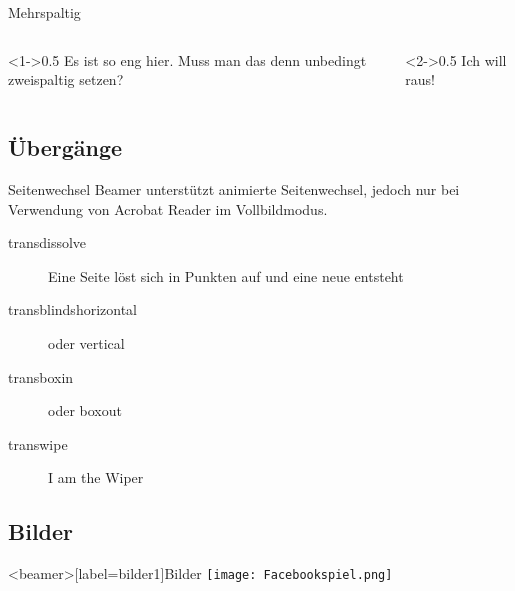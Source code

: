 \begin{frame}[label=inkrementell6]{Mehrspaltig}%
\begin{columns}[t]
\begin{column}<1->{0.5\textwidth}
Es ist so eng hier. Muss man das denn unbedingt zweispaltig setzen?
\end{column}%
\begin{column}<2->{0.5\textwidth}
Ich will raus!
\end{column}
\end{columns}
\end{frame}

\subsection{Übergänge}
\begin{frame}[label=trans]{Seitenwechsel}
  \transblindsvertical
  Beamer unterstützt animierte Seitenwechsel, jedoch nur
  bei Verwendung von Acrobat Reader im Vollbildmodus.
  \begin{description}
    \item[transdissolve] Eine Seite löst sich in Punkten auf und eine neue entsteht
    \item[transblindshorizontal] oder vertical
    \item[transboxin] oder boxout
    \item[transwipe] I am the Wiper
  \end{description}
\end{frame}

\subsection{Bilder}
\begin{frame}<beamer>[label=bilder1]{Bilder}
   \hypertarget{Bilder}{}
   \texttt{[image: Facebookspiel.png]}
\end{frame}

%
\begin{frame}[plain,label=bilder2]
  \begin{centering}%
    \par%
  \end{centering}%
\end{frame}

